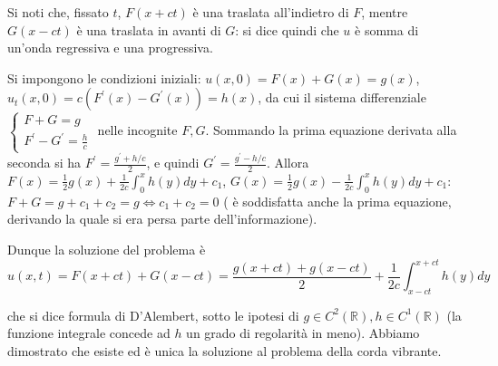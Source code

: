 \documentclass{article}
\begin{document}
Si noti che, fissato $t$, $F\left( x+ct\right) $ \`{e} una traslata
all'indietro di $F$, mentre $G\left( x-ct\right) $ \`{e} una traslata in
avanti di $G$: si dice quindi che $u$ \`{e} somma di un'onda regressiva e
una progressiva.

Si impongono le condizioni iniziali: $u\left( x,0\right) =F\left( x\right)
+G\left( x\right) =g\left( x\right) $, $u_{t}\left( x,0\right) =c\left(
F^{\prime }\left( x\right) -G^{\prime }\left( x\right) \right) =h\left(
x\right) $, da cui il sistema differenziale $\left\{ 
\begin{array}{c}
F+G=g \\ 
F^{\prime }-G^{\prime }=\frac{h}{c}%
\end{array}%
\right. $ nelle incognite $F,G$. Sommando la prima equazione derivata alla
seconda si ha $F^{\prime }=\frac{g^{\prime }+h/c}{2}$, e quindi $G^{\prime }=%
\frac{g^{\prime }-h/c}{2}$. Allora $F\left( x\right) =\frac{1}{2}g\left(
x\right) +\frac{1}{2c}\int_{0}^{x}h\left( y\right) dy+c_{1}$, $G\left(
x\right) =\frac{1}{2}g\left( x\right) -\frac{1}{2c}\int_{0}^{x}h\left(
y\right) dy+c_{1}$: $F+G=g+c_{1}+c_{2}=g\Longleftrightarrow c_{1}+c_{2}=0$ (%
\`{e} soddisfatta anche la prima equazione, derivando la quale si era persa
parte dell'informazione).

Dunque la soluzione del problema \`{e}%
\begin{equation*}
u\left( x,t\right) =F\left( x+ct\right) +G\left( x-ct\right) =\frac{g\left(
x+ct\right) +g\left( x-ct\right) }{2}+\frac{1}{2c}\int_{x-ct}^{x+ct}h\left(
y\right) dy
\end{equation*}

che si dice formula di D'Alembert, sotto le ipotesi di $g\in C^{2}\left( 
\mathbb{R}
\right) ,h\in C^{1}\left( 
\mathbb{R}
\right) $ (la funzione integrale concede ad $h$ un grado di regolarit\`{a}
in meno). Abbiamo dimostrato che esiste ed \`{e} unica la soluzione al
problema della corda vibrante.
\end{document}

